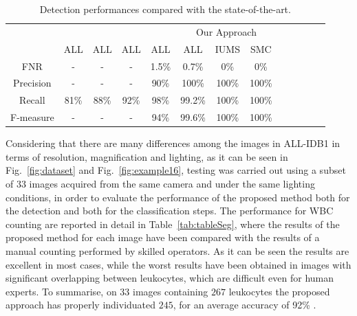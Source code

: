 \documentclass[final,a4paper,12pt,english]{UnicaPhdThesis3}
\begin{document}
\begin{table}[!b]
	\caption{Detection performances compared with the state-of-the-art.}
	\centering\tabcolsep=2mm
	\begin{tabular}{c  ccc ccc ccc ccc}
		\hline
		& \cite{Mahmood}	& \cite{Alilou} & \cite{Put14b}	& \cite{Alomari} & \multicolumn{3}{c}{Our Approach}\\
		&  	ALL  						&  ALL  					& 	ALL  				& 	ALL   					&   ALL  		&	IUMS 		& SMC \\
		\hline
		FNR			& 	- 							& 	- 				 	&	-					&	1.5\% 					&	0.7\% 	& 	0\% 		& 	0\% \\
		Precision 	&	-							& 	- 					&	- 					&	90\% 					&	100\% 	& 	100\% 		& 	100\% \\
		Recall		& 	81\% 						&  	88\% 				& 	92\% 				& 	98\% 					&	99.2\% 	& 	100\% 		& 	100\% \\
		F-measure 	& 	- 							&  	- 					& 	-					& 	94\% 					&    99.6\% 	& 	100\% 		& 	100\% \\
		\hline
	\end{tabular} 
	\label{tab:table_count}
\end{table}

Considering that there are many differences among the images in ALL-IDB1 in terms of resolution, magnification and lighting, as it can be seen in Fig.~\ref{fig:dataset} and Fig.~\ref{fig:example16}, testing was carried out using a subset of $33$ images acquired from the same camera and under the same lighting conditions, in order to evaluate the performance of the proposed method  both for the detection and both for the classification steps. The  performance for WBC counting are reported in detail in Table~\ref{tab:tableSeg}, where the results of the proposed method for each image have been compared with the results of a manual counting performed by skilled operators. As it can be seen the results are excellent in most cases, while the worst results have been obtained in images with significant overlapping between leukocytes, which are difficult even for human experts. To summarise, on $33$ images containing $267$ leukocytes the proposed approach has properly individuated $245$, for an  average  accuracy  of 92\% . 
\end{document}
